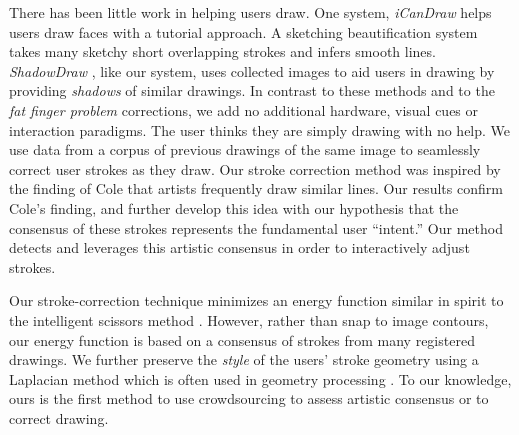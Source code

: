 There has been little work in helping users draw. One system, \emph{iCanDraw} \cite{Dixon:2010:IUS} helps users draw faces with a tutorial approach. A sketching beautification system~\cite{Orbay2011} takes many sketchy short overlapping strokes and infers smooth lines. \emph{ShadowDraw} \cite{Lee:2011}, like our system, uses collected images to aid users in drawing by providing {\em shadows} of similar drawings.  In contrast to these methods and to the \emph{fat finger problem} corrections, we add no additional hardware, visual cues or interaction paradigms. The user thinks they are simply drawing with no help. We use data from a corpus of previous drawings of the same image to seamlessly correct user strokes as they draw. Our stroke correction method was inspired by the finding of Cole \etal {} that artists frequently draw similar lines. Our results confirm Cole's finding, and further develop this idea with our hypothesis that the consensus of these strokes represents the fundamental user ``intent.'' Our method detects and leverages this artistic consensus in order to
interactively adjust strokes.

Our stroke-correction technique minimizes an energy function similar
in spirit to the intelligent scissors
method \cite{Mortensen:1995:ISF}. However, rather than snap to image
contours, our energy function is based on a consensus of strokes from many
registered drawings. We further preserve the {\em style} of the
users' stroke geometry using a Laplacian method which is often used
in geometry processing \cite{Sorkine:2004:LSE}. To our knowledge,
ours is the first method to use crowdsourcing to assess artistic
consensus or to correct drawing.  
